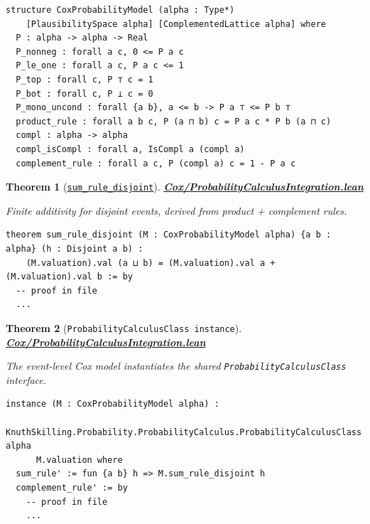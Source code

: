 \documentclass[11pt]{article}
\newtheorem{theorem}{Theorem}[section]
\theoremstyle{definition}
\theoremstyle{remark}
\begin{document}
\begin{lstlisting}[caption={Event-level Cox model (product + complement rules)}]
structure CoxProbabilityModel (alpha : Type*)
    [PlausibilitySpace alpha] [ComplementedLattice alpha] where
  P : alpha -> alpha -> Real
  P_nonneg : forall a c, 0 <= P a c
  P_le_one : forall a c, P a c <= 1
  P_top : forall c, P ⊤ c = 1
  P_bot : forall c, P ⊥ c = 0
  P_mono_uncond : forall {a b}, a <= b -> P a ⊤ <= P b ⊤
  product_rule : forall a b c, P (a ⊓ b) c = P a c * P b (a ⊓ c)
  compl : alpha -> alpha
  compl_isCompl : forall a, IsCompl a (compl a)
  complement_rule : forall a c, P (compl a) c = 1 - P a c
\end{lstlisting}

\begin{theorem}[\href{https://github.com/zariuq/ks-foundations-of-inference/blob/main/ProbabilityTheory/Cox/ProbabilityCalculusIntegration.lean}{\texttt{sum\_rule\_disjoint}}]
\textbf{\href{https://github.com/zariuq/ks-foundations-of-inference/blob/main/ProbabilityTheory/Cox/ProbabilityCalculusIntegration.lean}{Cox/ProbabilityCalculusIntegration.lean}}

Finite additivity for disjoint events, derived from product + complement rules.
\end{theorem}

\begin{lstlisting}[caption={Disjoint additivity derived from Cox rules}]
theorem sum_rule_disjoint (M : CoxProbabilityModel alpha) {a b : alpha} (h : Disjoint a b) :
    (M.valuation).val (a ⊔ b) = (M.valuation).val a + (M.valuation).val b := by
  -- proof in file
  ...
\end{lstlisting}

\begin{theorem}[\texttt{ProbabilityCalculusClass instance}]
\textbf{\href{https://github.com/zariuq/ks-foundations-of-inference/blob/main/ProbabilityTheory/Cox/ProbabilityCalculusIntegration.lean}{Cox/ProbabilityCalculusIntegration.lean}}

The event-level Cox model instantiates the shared \texttt{ProbabilityCalculusClass} interface.
\end{theorem}

\begin{lstlisting}[caption={ProbabilityCalculusClass instance for CoxProbabilityModel}]
instance (M : CoxProbabilityModel alpha) :
    KnuthSkilling.Probability.ProbabilityCalculus.ProbabilityCalculusClass alpha
      M.valuation where
  sum_rule' := fun {a b} h => M.sum_rule_disjoint h
  complement_rule' := by
    -- proof in file
    ...
\end{lstlisting}
\end{document}
